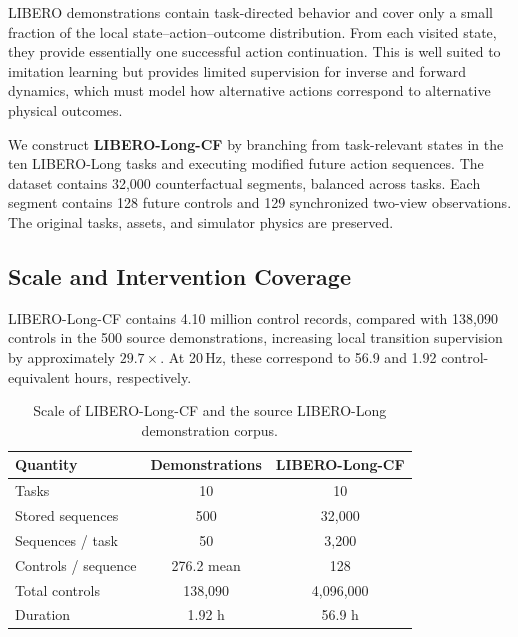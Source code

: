 LIBERO demonstrations contain task-directed behavior and cover only a small
fraction of the local state--action--outcome distribution. From each visited
state, they provide essentially one successful action continuation. This is
well suited to imitation learning but provides limited supervision for inverse
and forward dynamics, which must model how alternative actions correspond to
alternative physical outcomes.

We construct \textbf{LIBERO-Long-CF} by branching from task-relevant states in
the ten LIBERO-Long tasks and executing modified future action sequences.
The dataset contains 32,000 counterfactual segments, balanced across tasks.
Each segment contains 128 future controls and 129 synchronized two-view
observations. The original tasks, assets, and simulator physics are preserved.

\subsection{Scale and Intervention Coverage}
\label{app:libero-cf-scale}

LIBERO-Long-CF contains 4.10 million control records, compared with 138,090
controls in the 500 source demonstrations, increasing local transition
supervision by approximately $29.7\times$. At 20\,Hz, these correspond to
56.9 and 1.92 control-equivalent hours, respectively.

\begin{table}[t]
    \centering
    \caption{
    Scale of LIBERO-Long-CF and the source LIBERO-Long demonstration corpus.
    }
    \label{tab:libero-cf-scale}
    \small
    \begin{tabular}{@{}lcc@{}}
        \toprule
        \textbf{Quantity}
        & \textbf{Demonstrations}
        & \textbf{LIBERO-Long-CF} \\
        \midrule
        Tasks
        & 10
        & 10 \\
        Stored sequences
        & 500
        & 32,000 \\
        Sequences / task
        & 50
        & 3,200 \\
        Controls / sequence
        & 276.2 mean
        & 128 \\
        Total controls
        & 138,090
        & 4,096,000 \\
        Duration
        & 1.92 h
        & 56.9 h \\
        \bottomrule
    \end{tabular}
\end{table}

